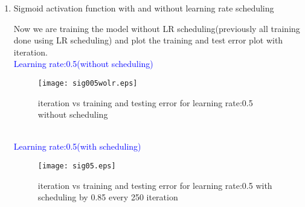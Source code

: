 \documentclass[12pt,a4paper]{article}
\newenvironment{QandA}{\begin{enumerate}[label=\bfseries\alph*.]\bfseries}
                      {\end{enumerate}}
\newenvironment{answered}{\par\normalfont}{}
\begin{document}
\begin{QandA}
\begin{answered}
\begin{figure}[h!]
         \end{figure}\\
         \textcolor{blue}{Learning rate:0.05\\}
         \begin{figure}[h!]
	       \begin{center}
		     \texttt{[image: sig005.eps]}
		       \caption{iteration vs training and testing error for learning rate:0.05}
		       \label{fig:snr20fft}
	       \end{center}
		
         \end{figure}\\
         \textcolor{blue}{Learning rate:0.1\\}
         \begin{figure}[h!]
	       \begin{center}
		     \texttt{[image: sig01.eps]}
		       \caption{iteration vs training and testing error for learning rate:0.1}
		       \label{fig:snr20fft}
	       \end{center}
		
         \end{figure}\\
          We can see from the figures that errors are convergeing at a faster rate with the increase of learning rate.For the 0.1 learning rate the error converge quickly than others.
         \end{answered}
        
         \newpage
         \item Sigmoid activation function with and without learning rate scheduling 
         \begin{answered}
         Now we are training the model without LR scheduling(previously all training done using LR scheduling) and plot the training and test error plot with iteration.\\
          \textcolor{blue}{Learning rate:0.5(without scheduling)\\}
         \begin{figure}[h!]
	       \begin{center}
		     \texttt{[image: sig005wolr.eps]}
		       \caption{iteration vs training and testing error for learning rate:0.5 without scheduling }
		       \label{fig:snr20fft}
	       \end{center}
		
         \end{figure}\\
         \textcolor{blue}{Learning rate:0.5(with scheduling)\\}
         \begin{figure}[h!]
	       \begin{center}
		     \texttt{[image: sig05.eps]}
		       \caption{iteration vs training and testing error for learning rate:0.5 with scheduling by 0.85 every 250 iteration}
		       \label{fig:snr20fft}
	       \end{center}
		

\end{figure}
\end{answered}
\end{QandA}
\end{document}
